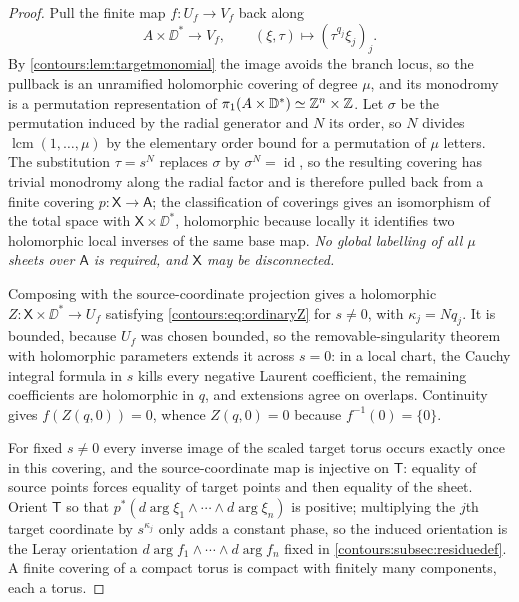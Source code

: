 \documentclass[11pt,letterpaper]{article}
\theoremstyle{definition}
\theoremstyle{remark}
\newcommand{\id}{\operatorname{id}}\newcommand{\vH}{v_{\!H}}
\numberwithin{equation}{section}
\begin{document}
\begin{proof}
Pull the finite map $f:U_f\to V_f$ back along
\[
  A\times\DD^*\longrightarrow V_f,\qquad
  (\xi,\tau)\longmapsto(\tau^{q_j}\xi_j)_j .
\]
By \cref{contours:lem:targetmonomial} the image avoids the branch locus, so the
pullback is an unramified holomorphic covering of degree $\mu$, and its monodromy
is a permutation representation of
$\pi_1(A\times\mathbb D^*)\simeq\mathbb Z^n\times\mathbb Z$. Let $\sigma$ be the permutation induced
by the radial generator and $N$ its order, so $N$ divides
$\operatorname{lcm}(1,\ldots,\mu)$ by the elementary order bound for a
permutation of $\mu$ letters. The substitution $\tau=s^N$ replaces $\sigma$ by
$\sigma^N=\id$, so the resulting covering has trivial monodromy along the radial
factor and is therefore pulled back from a finite covering $p:\mathsf X\to\mathsf A$;
the classification of coverings gives an isomorphism of the total space with
$\mathsf X\times\DD^*$, holomorphic because locally it identifies two
holomorphic local inverses of the same base map. \emph{No global labelling of
all $\mu$ sheets over $\mathsf A$ is required, and $\mathsf X$ may be disconnected.}

Composing with the source-coordinate projection gives a holomorphic
$Z:\mathsf X\times\DD^*\to U_f$ satisfying \eqref{contours:eq:ordinaryZ} for
$s\ne0$, with $\kappa_j=Nq_j$. It is bounded, because $U_f$ was chosen bounded, so
the removable-singularity theorem with holomorphic parameters extends it across
$s=0$: in a local chart, the Cauchy integral formula in $s$ kills every negative
Laurent coefficient, the remaining coefficients are holomorphic in $q$, and
extensions agree on overlaps. Continuity gives $f(Z(q,0))=0$, whence
$Z(q,0)=0$ because $f^{-1}(0)=\{0\}$.

For fixed $s\ne0$ every inverse image of the scaled target torus occurs exactly
once in this covering, and the source-coordinate map is injective on
$\mathsf T$: equality of source points forces equality of target points and then
equality of the sheet. Orient $\mathsf T$ so that
$p^*(d\arg\xi_1\wedge\cdots\wedge d\arg\xi_n)$ is positive; multiplying the
$j$th target coordinate by $s^{\kappa_j}$ only adds a constant phase, so the
induced orientation is the Leray orientation
$d\arg f_1\wedge\cdots\wedge d\arg f_n$ fixed in
\cref{contours:subsec:residuedef}. A finite covering of a compact torus is
compact with finitely many components, each a torus.
\end{proof}
\end{document}
